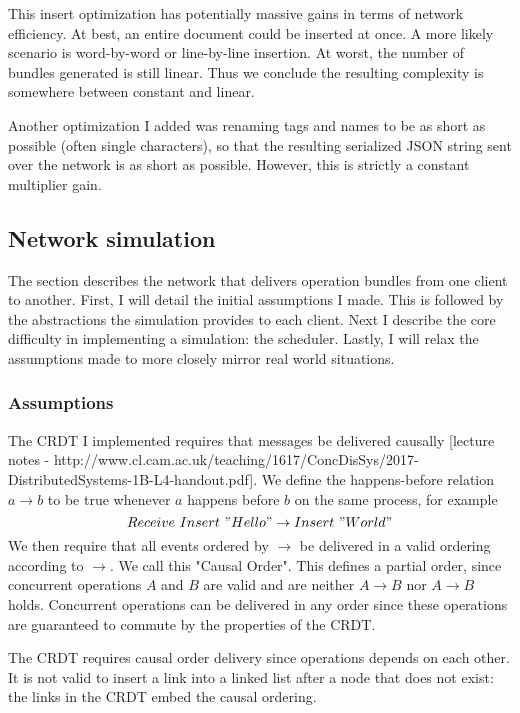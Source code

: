 \documentclass[12pt,a4paper,twoside,openright]{report}
\begin{document}
			This insert optimization has potentially massive gains in terms of network efficiency. At best, an entire document could be inserted at once. A more likely scenario is word-by-word or line-by-line insertion. At worst, the number of bundles generated is still linear. Thus we conclude the resulting complexity is somewhere between constant and linear.
			
			Another optimization I added was renaming tags and names to be as short as possible (often single characters), so that the resulting serialized JSON string sent over the network is as short as possible. However, this is strictly a constant multiplier gain.
	
	\subsection{Network simulation}
		The section describes the network that delivers operation bundles from one client to another. First, I will detail the initial assumptions I made. This is followed by the abstractions the simulation provides to each client. Next I describe the core difficulty in implementing a simulation: the scheduler. Lastly, I will relax the assumptions made to more closely mirror real world situations.
		
		\subsubsection{Assumptions} 
		The CRDT I implemented requires that messages be delivered causally [lecture notes - http://www.cl.cam.ac.uk/teaching/1617/ConcDisSys/2017-DistributedSystems-1B-L4-handout.pdf]. We define the happens-before relation \(a \rightarrow b\) to be true whenever $a$ happens before $b$ on the same process, for example \[Receive\ Insert\ "Hello" \rightarrow Insert\ " World"\]
		We then require that all events ordered by $\rightarrow$ be delivered in a valid ordering according to $\rightarrow$. We call this "Causal Order". 	
		This defines a partial order, since concurrent operations $A$ and $B$ are valid and are neither $A \rightarrow B$ nor $A \rightarrow B$ holds. Concurrent operations can be delivered in any order since these operations are guaranteed to commute by the properties of the CRDT.
		
		The CRDT requires causal order delivery since operations depends on each other. It is not valid to insert a link into a linked list after a node that does not exist: the links in the CRDT embed the causal ordering.
		
\end{document}
